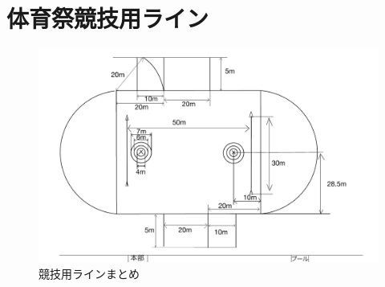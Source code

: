 \documentclass[titlepage]{jarticle}
\begin{document}
 \section{体育祭競技用ライン}
   \begin{figure}[H]
    \centering
    \includegraphics[width=12cm]{line.pdf}
    \caption{競技用ラインまとめ}
   \end{figure}
\end{document}
